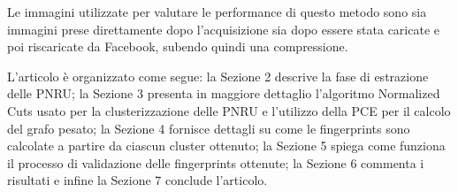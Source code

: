 Le immagini utilizzate per valutare le performance di questo metodo sono sia immagini prese direttamente dopo l'acquisizione sia dopo essere stata caricate e poi riscaricate da Facebook, subendo quindi una compressione.

L'articolo è organizzato come segue: la Sezione 2 descrive la fase di estrazione delle PNRU; la Sezione 3 presenta in maggiore dettaglio l'algoritmo Normalized Cuts usato per la clusterizzazione delle PNRU e l'utilizzo della PCE per il calcolo del grafo pesato; la Sezione 4 fornisce dettagli su come le fingerprints sono calcolate a partire da ciascun cluster ottenuto; la Sezione 5 spiega come funziona il processo di validazione delle fingerprints ottenute; la Sezione 6 commenta i risultati e infine la Sezione 7 conclude l'articolo.
